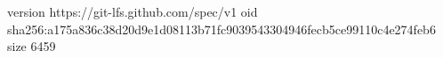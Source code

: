 version https://git-lfs.github.com/spec/v1
oid sha256:a175a836c38d20d9e1d08113b71fc9039543304946fecb5ce99110c4e274feb6
size 6459
